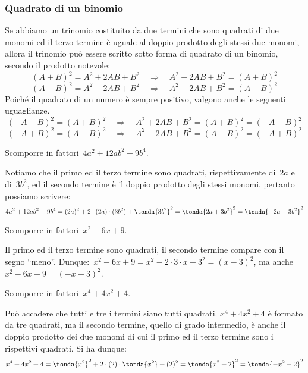 \subsubsection{Quadrato di un binomio}
\label{subsubsec:divpol_quadbin}

Se abbiamo un trinomio costituito da due termini che sono quadrati di due 
monomi ed il terzo termine è uguale al doppio prodotto
degli stessi due monomi, allora il trinomio può essere scritto sotto forma di 
quadrato di un binomio, secondo il prodotto notevole:
\[(A+B)^{2}=A^{2}+2AB+B^{2}\quad \Rightarrow \quad 
  A^{2}+2AB+B^{2}=(A+B)^{2}\]
\[(A-B)^{2}=A^{2}-2AB+B^{2}\quad \Rightarrow \quad 
  A^{2}-2AB+B^{2}=(A-B)^{2}\]
Poiché il quadrato di un numero è sempre positivo, valgono anche le seguenti 
uguaglianze.
\[(-A-B)^{2}=(A+B)^{2}\quad\Rightarrow\quad 
  A^{2}+2AB+B^{2}=(A+B)^{2}=(-A-B)^{2}\]
\[(-A+B)^{2}=(A-B)^{2}\quad \Rightarrow \quad 
A^{2}-2AB+B^{2}=(A-B)^{2}=(-A+B)^{2}\]

 \begin{esempio}
Scomporre in fattori~\(4a^{2}+12ab^{2}+9b^{4}\).

Notiamo che il primo ed il terzo termine sono quadrati, rispettivamente 
di~\(2a\) e di~\(3b^{2}\), ed il secondo termine è il doppio prodotto degli 
stessi 
monomi, pertanto possiamo scrivere:
\[4a^{2}+12{ab}^{2}+9b^{4}=(2a)^{2}+2 \cdot (2a) \cdot (3b^{2})+
  \tonda{3b^{2}}^{2}=\tonda{2a+3b^{2}}^{2}=\tonda{-2a-3b^{2}}^{2}\]
 \end{esempio}

 \begin{esempio}
Scomporre in fattori~\(x^2-6x+9\).

Il primo ed il terzo termine sono quadrati, il secondo termine compare con il 
segno ``meno''.
Dunque:~\(x^2-6x+9=x^2-2\cdot 3\cdot x+3^{2}=(x-3)^{2}\), 
ma anche~\(x^2-6x+9=(-x+3)^{2}\).
 \end{esempio}

 \begin{esempio}
Scomporre in fattori~\(x^4+4x^2+4\).

Può accadere che tutti e tre i termini siano tutti quadrati. 
\(x^4+4x^2+4\) è formato da tre quadrati, ma il secondo termine, quello 
di grado intermedio, è anche il doppio prodotto dei due monomi di cui il 
primo ed il terzo termine sono i rispettivi quadrati.
Si ha dunque:
\[x^4+4x^2+4=
  \tonda{x^2}^{2}+2 \cdot (2) \cdot \tonda{x^2}+(2)^{2}=
  \tonda{x^2+2}^{2}=\tonda{-x^2-2}^{2}\]
 \end{esempio}

